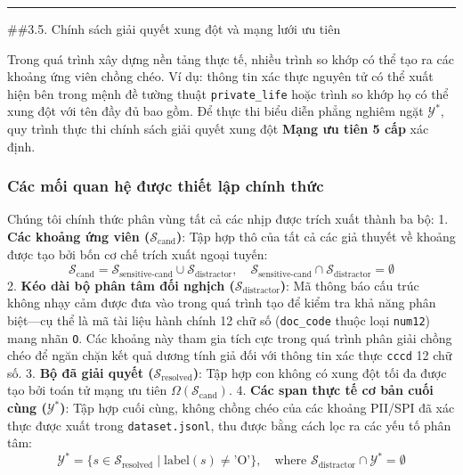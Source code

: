 \documentclass[
  11pt,
  a4paper,
]{article}
\begin{document}
\begin{center}\rule{0.5\linewidth}{0.5pt}\end{center}

\#\#3.5. Chính sách giải quyết xung đột và mạng lưới ưu tiên

Trong quá trình xây dựng nền tảng thực tế, nhiều trình so khớp có thể
tạo ra các khoảng ứng viên chồng chéo. Ví dụ: thông tin xác thực nguyên
tử có thể xuất hiện bên trong mệnh đề tường thuật \texttt{private\_life}
hoặc trình so khớp họ có thể xung đột với tên đầy đủ bao gồm. Để thực
thi biểu diễn phẳng nghiêm ngặt \(\mathcal{Y}^*\), quy trình thực thi
chính sách giải quyết xung đột \textbf{Mạng ưu tiên 5 cấp} xác định.

\subsubsection{Các mối quan hệ được thiết lập chính
thức}\label{cuxe1c-mux1ed1i-quan-hux1ec7-ux111ux1b0ux1ee3c-thiux1ebft-lux1eadp-chuxednh-thux1ee9c}

Chúng tôi chính thức phân vùng tất cả các nhịp được trích xuất thành ba
bộ: 1. \textbf{Các khoảng ứng viên (\(\mathcal{S}_{\text{cand}}\))}: Tập
hợp thô của tất cả các giả thuyết về khoảng được tạo bởi bốn cơ chế
trích xuất ngoại tuyến:
\[\mathcal{S}_{\text{cand}} = \mathcal{S}_{\text{sensitive-cand}} \cup \mathcal{S}_{\text{distractor}}, \quad \mathcal{S}_{\text{sensitive-cand}} \cap \mathcal{S}_{\text{distractor}} = \emptyset\]
2. \textbf{Kéo dài bộ phân tâm đối nghịch
(\(\mathcal{S}_{\text{distractor}}\))}: Mã thông báo cấu trúc không nhạy
cảm được đưa vào trong quá trình tạo để kiểm tra khả năng phân biệt---cụ
thể là mã tài liệu hành chính 12 chữ số (\texttt{doc\_code} thuộc loại
\texttt{num12}) mang nhãn \texttt{O}. Các khoảng này tham gia tích cực
trong quá trình phân giải chồng chéo để ngăn chặn kết quả dương tính giả
đối với thông tin xác thực \texttt{cccd} 12 chữ số. 3. \textbf{Bộ đã
giải quyết (\(\mathcal{S}_{\text{resolved}}\))}: Tập hợp con không có
xung đột tối đa được tạo bởi toán tử mạng ưu tiên
\(\Omega(\mathcal{S}_{\text{cand}})\). 4. \textbf{Các span thực tế cơ
bản cuối cùng (\(\mathcal{Y}^*\))}: Tập hợp cuối cùng, không chồng chéo
của các khoảng PII/SPI đã xác thực được xuất trong
\texttt{dataset.jsonl}, thu được bằng cách lọc ra các yếu tố phân tâm:
\[\mathcal{Y}^* = \{s \in \mathcal{S}_{\text{resolved}} \mid \text{label}(s) \neq \text{'O'}\}, \quad \text{where } \mathcal{S}_{\text{distractor}} \cap \mathcal{Y}^* = \emptyset\]
\end{document}

